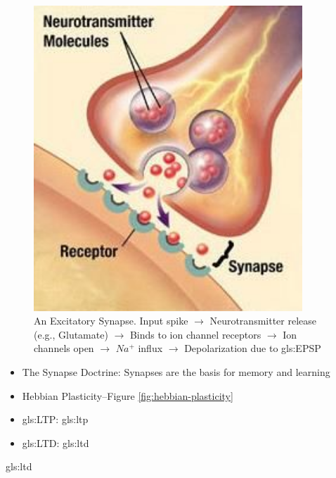\documentclass[]{article}
\begin{document}
\begin{figure}[H]
	\caption[An Excitatory Synapse]{An Excitatory Synapse. Input spike  $\rightarrow$
		Neurotransmitter 	release (e.g., Glutamate)  $\rightarrow$ Binds to ion channel receptors $\rightarrow$ Ion channels open $\rightarrow$ $Na^+$ influx  $\rightarrow$ 	Depolarization due to \gls{gls:EPSP}}
	\includegraphics[width=0.9\textwidth]{synapse4}
\end{figure}

\begin{itemize}
	\item The Synapse Doctrine: Synapses are the basis for memory and learning
	\item Hebbian Plasticity--Figure \ref{fig:hebbian-plasticity}
	\item \acrfull{gls:LTP}:  \glsdesc{gls:ltp}
	\item \acrfull{gls:LTD}:  \glsdesc{gls:ltd}
\end{itemize}

\glsdesc{gls:ltd}
\end{document}
